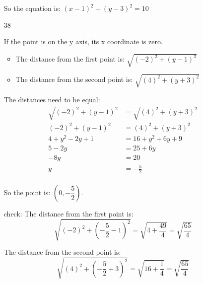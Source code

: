 \documentclass[fleqn,addpoints]{exam}
\begin{document}
\begin{itemize}
So the equation is: $(x-1)^2+(y-3)^2 = 10$

\item[38]

If the point is on the y axis, its x coordinate is zero.

\begin{itemize}
  \item The distance from the first point is: $\sqrt{(-2)^2 + (y-1)^2}$
  \item The distance from the second point is: $\sqrt{(4)^2 + (y+3)^2}$
\end{itemize}

The distances need to be equal:
\begin{align*}
  \sqrt{(-2)^2 + (y-1)^2} &= \sqrt{(4)^2 + (y+3)^2} \\
  (-2)^2 + (y-1)^2 &= (4)^2 + (y+3)^2 \\
  4 + y^2 - 2y + 1 &= 16 + y^2 + 6y + 9 \\
  5  - 2y &= 25 + 6y  \\
    -8y &= 20  \\
    y &= -\frac{5}{2}  \\
\end{align*}

So the point is: $(0, -\dfrac{5}{2})$.

check:
  The distance from the first point is: 
\[
  \sqrt{(-2)^2 + \left( -\dfrac{5}{2} - 1 \right)^2} = \sqrt{4 + \dfrac{49}{4}} = \sqrt{\dfrac{65}{4}}
\]

The distance from the second point is: 
\[
  \sqrt{(4)^2 + \left( -\dfrac{5}{2}+3 \right)^2} = \sqrt{16 + \dfrac{1}{4}} = \sqrt{\dfrac{65}{4}}
\]

\end{itemize}

\fi
\end{document}
